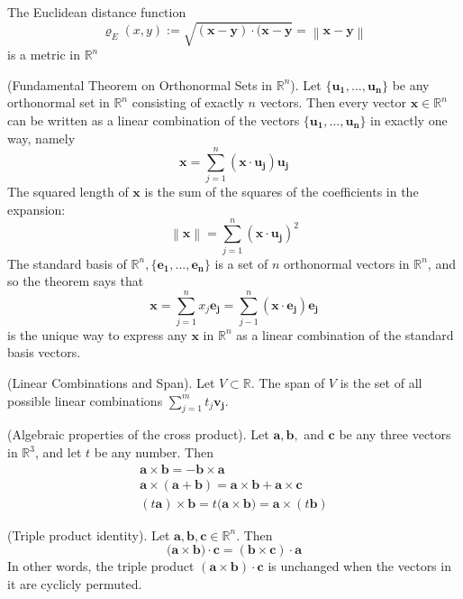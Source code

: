 \documentclass{article}
\newcommand{\norm}[1]{\left \lVert #1 \right \rVert}
\begin{document}
\begin{theorem}
    The Euclidean distance function
    $$\varrho_E(x,y):=\mathbf{\sqrt{(x-y)\cdot(x-y}=\norm{x-y}}$$
    is a metric in $\mathbb{R}^n$
\end{theorem}
\begin{theorem}
    (Fundamental Theorem on Orthonormal Sets in $\mathbb{R}^n$).
    Let $\{\mathbf{u_1},...,\mathbf{u_n}\}$ be any orthonormal set in $\mathbb{R}^n$ consisting of exactly $n$ vectors. Then every vector $\mathbf{x}\in\mathbb{R}^n$ can be written as a linear combination of the vectors $\{\mathbf{u_1},...,\mathbf{u_n}\}$ in exactly one way, namely
    $$\mathbf{x}=\sum_{j=1}^n(\mathbf{x}\cdot\mathbf{u_j})\mathbf{u_j}$$
    The squared length of $\mathbf{x}$ is the sum of the squares of the coefficients in the expansion:
    $$\mathbf{\norm{x}}=\sum_{j=1}^n(\mathbf{x}\cdot\mathbf{u_j})^2$$
    The standard basis of $\mathbb{R}^n, \{\mathbf{e_1}, . . . , \mathbf{e_n}\}$ is a set of $n$ orthonormal vectors in $\mathbb{R}^n$, and so the theorem says that
    $$\mathbf{x}=\sum_{j=1}^nx_j\mathbf{e_j}=\sum_{j-1}^n(\mathbf{x}\cdot\mathbf{e_j})\mathbf{e_j}$$
    is the unique way to express any $\mathbf{x}$ in $\mathbb{R}^n$ as a linear combination of the standard basis vectors.

\end{theorem}

\begin{definition}
    (Linear Combinations and Span). Let $V \subset \mathbb{R}$. The span of $V$ is the set of all possible linear combinations $\sum_{j=1}^mt_j\mathbf{v_j}$.
\end{definition}

\begin{theorem}
    (Algebraic properties of the cross product).
    Let $\mathbf{a, b,}$ and $\mathbf{c}$ be any three vectors in $\mathbb{R}^3$, and let $t$ be any number. Then
    \begin{gather*}
        \mathbf{a\times{b}=-b\times{a}} \\
        \mathbf{a\times(a+b)=a\times{b}+a\times{c}} \\
        (t\mathbf{a})\times{\mathbf{b}} = t(\mathbf{a\times{b})}= \mathbf{a}\times{(t\mathbf{b})}
    \end{gather*}

\end{theorem}

\begin{theorem}
    (Triple product identity).
    Let $\mathbf{a, b, c} \in \mathbb{R}^n$. Then
    $$(\mathbf{a\times{b})\cdot{c}=(b\times{c})\cdot{a}}$$
    In other words, the triple product $\mathbf{(a\times{b})\cdot{c}}$ is unchanged when the vectors in it are cyclicly permuted.
\end{theorem}
\end{document}
